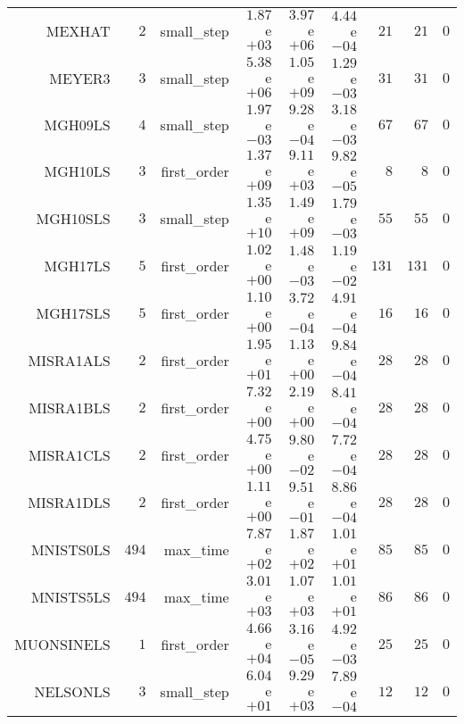 \begin{longtable}{rrrrrrrrr}
MEXHAT & \(     2\) & small\_step & \( 1.87\)e\(+03\) & \( 3.97\)e\(+06\) & \( 4.44\)e\(-04\) & \(    21\) & \(    21\) & \(     0\) \\
MEYER3 & \(     3\) & small\_step & \( 5.38\)e\(+06\) & \( 1.05\)e\(+09\) & \( 1.29\)e\(-03\) & \(    31\) & \(    31\) & \(     0\) \\
MGH09LS & \(     4\) & small\_step & \( 1.97\)e\(-03\) & \( 9.28\)e\(-04\) & \( 3.18\)e\(-03\) & \(    67\) & \(    67\) & \(     0\) \\
MGH10LS & \(     3\) & first\_order & \( 1.37\)e\(+09\) & \( 9.11\)e\(+03\) & \( 9.82\)e\(-05\) & \(     8\) & \(     8\) & \(     0\) \\
MGH10SLS & \(     3\) & small\_step & \( 1.35\)e\(+10\) & \( 1.49\)e\(+09\) & \( 1.79\)e\(-03\) & \(    55\) & \(    55\) & \(     0\) \\
MGH17LS & \(     5\) & first\_order & \( 1.02\)e\(+00\) & \( 1.48\)e\(-03\) & \( 1.19\)e\(-02\) & \(   131\) & \(   131\) & \(     0\) \\
MGH17SLS & \(     5\) & first\_order & \( 1.10\)e\(+00\) & \( 3.72\)e\(-04\) & \( 4.91\)e\(-04\) & \(    16\) & \(    16\) & \(     0\) \\
MISRA1ALS & \(     2\) & first\_order & \( 1.95\)e\(+01\) & \( 1.13\)e\(+00\) & \( 9.84\)e\(-04\) & \(    28\) & \(    28\) & \(     0\) \\
MISRA1BLS & \(     2\) & first\_order & \( 7.32\)e\(+00\) & \( 2.19\)e\(+00\) & \( 8.41\)e\(-04\) & \(    28\) & \(    28\) & \(     0\) \\
MISRA1CLS & \(     2\) & first\_order & \( 4.75\)e\(+00\) & \( 9.80\)e\(-02\) & \( 7.72\)e\(-04\) & \(    28\) & \(    28\) & \(     0\) \\
MISRA1DLS & \(     2\) & first\_order & \( 1.11\)e\(+00\) & \( 9.51\)e\(-01\) & \( 8.86\)e\(-04\) & \(    28\) & \(    28\) & \(     0\) \\
MNISTS0LS & \(   494\) & max\_time & \( 7.87\)e\(+02\) & \( 1.87\)e\(+02\) & \( 1.01\)e\(+01\) & \(    85\) & \(    85\) & \(     0\) \\
MNISTS5LS & \(   494\) & max\_time & \( 3.01\)e\(+03\) & \( 1.07\)e\(+03\) & \( 1.01\)e\(+01\) & \(    86\) & \(    86\) & \(     0\) \\
MUONSINELS & \(     1\) & first\_order & \( 4.66\)e\(+04\) & \( 3.16\)e\(-05\) & \( 4.92\)e\(-03\) & \(    25\) & \(    25\) & \(     0\) \\
NELSONLS & \(     3\) & small\_step & \( 6.04\)e\(+01\) & \( 9.29\)e\(+03\) & \( 7.89\)e\(-04\) & \(    12\) & \(    12\) & \(     0\) \\

\end{longtable}
